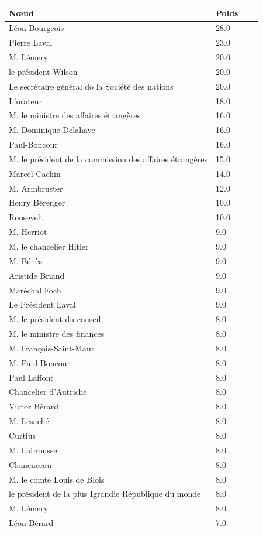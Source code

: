 \documentclass[a4paper,twoside,12pt]{book}
\begin{document}
\begin{table}[htbp]
\centering
\begin{tabular}{ll@{\hskip 1cm}ll}
\hline
\textbf{Nœud} & \textbf{Poids} \\
\hline
Léon Bourgeois & 28.0 \\
Pierre Laval & 23.0 \\
M. Lémery & 20.0 \\
le président Wilson & 20.0 \\
Le secrétaire général do la Société des nations & 20.0 \\
L'orateur & 18.0 \\
M. le ministre des affaires étrangères & 16.0 \\
M. Dominique Delahaye & 16.0 \\
Paul-Boncour & 16.0 \\
M. le président de la commission des affaires étrangères & 15.0 \\
Marcel Cachin & 14.0 \\
M. Armbruster & 12.0 \\
Henry Bérenger & 10.0 \\
Roosevelt & 10.0 \\
M. Herriot & 9.0 \\
M. le chancelier Hitler & 9.0 \\
M. Bénès & 9.0 \\
Aristide Briand & 9.0 \\
Maréchal Foch & 9.0 \\
Le Président Laval & 9.0 \\
M. le président du conseil & 8.0 \\
M. le ministre des finances & 8.0 \\
M. François-Saint-Maur & 8.0 \\
M. Paul-Boncour & 8.0 \\
Paul Laffont & 8.0 \\
Chancelier d'Autriche & 8.0 \\
Victor Bérard & 8.0 \\
M. Lesaché & 8.0 \\
Curtius & 8.0 \\
M. Labrousse & 8.0 \\
Clemenceau & 8.0 \\
M. le comte Louis de Blois & 8.0 \\
le président de la plus Igrandie République du monde & 8.0 \\
M. Lémery & 8.0 \\
Léon Bérard & 7.0 \\

\end{tabular}
\end{table}
\end{document}
